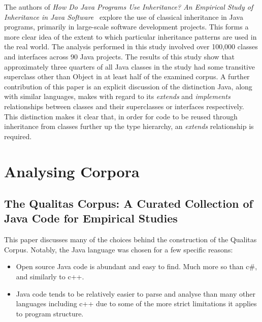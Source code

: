 \newline
\newline
The authors of \textit{How Do Java Programs Use Inheritance? An Empirical Study of Inheritance in Java Software~\cite{HowProgramsUseInheritance}} explore the use of classical inheritance in Java programs, primarily in large-scale software development projects. This forms a more clear idea of the extent to which particular inheritance patterns are used in the real world. The analysis performed in this study involved over 100,000 classes and interfaces across 90 Java projects. The results of this study show that approximately three quarters of all Java classes in the study had some transitive superclass other than Object in at least half of the examined corpus. \newline
A further contribution of this paper is an explicit discussion of the distinction Java, along with similar languages, makes with regard to its \textit{extends} and \textit{implements} relationships between classes and their superclasses or interfaces respectively. This distinction makes it clear that, in order for code to be reused through inheritance from classes further up the type hierarchy, an \textit{extends} relationship is required.

\section{Analysing Corpora}
\subsection{The Qualitas Corpus: A Curated Collection of Java Code for Empirical Studies~\cite{QualitasCorpus}}
This paper discusses many of the choices behind the construction of the Qualitas Corpus. Notably, the Java language was chosen for a few specific reasons:
\begin{itemize}
	\item Open source Java code is abundant and easy to find. Much more so than c\#, and similarly to c++.
	\item Java code tends to be relatively easier to parse and analyse than many other languages including c++ due to some of the more strict limitations it applies to program structure.
\end{itemize}

